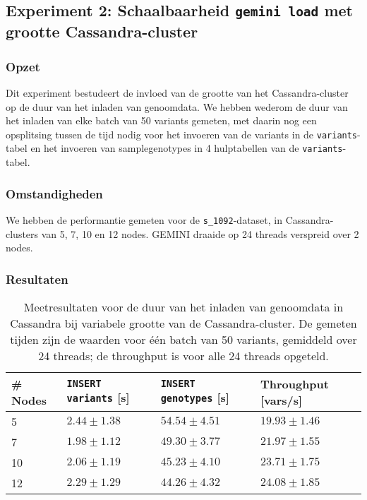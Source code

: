   
\subsection{Experiment 2: Schaalbaarheid \texttt{gemini load} met grootte Cassandra-cluster}
\label{exp2}

\subsubsection{Opzet}

Dit experiment bestudeert de invloed van de grootte van het Cassandra-cluster op de duur van het inladen van genoomdata. We hebben wederom de duur van het inladen van elke batch van 50 variants gemeten, met daarin nog een opsplitsing tussen de tijd nodig voor het invoeren van de variants in de \texttt{variants}-tabel en het invoeren van samplegenotypes in 4 hulptabellen van de \texttt{variants}-tabel.

\subsubsection{Omstandigheden}

We hebben de performantie gemeten voor de \texttt{s\_1092}-dataset, in Cassandra-clusters van 5, 7, 10 en 12 nodes. GEMINI draaide op 24 threads verspreid over 2 nodes.

\subsubsection{Resultaten}

\begin{table}[h]
\centering
\begin{tabular}{@{}llll@{}}
\cmidrule(l){1-4}
\multicolumn{1}{|l|}{\textbf{\# Nodes}}  & \multicolumn{1}{l|}{\textbf{\texttt{INSERT variants} [s]}} & \multicolumn{1}{l|}{\textbf{\texttt{INSERT genotypes} [s]}} & \multicolumn{1}{l|}{\textbf{Throughput [vars/s]}}             \\ \midrule
\multicolumn{1}{|l|}{5} & \multicolumn{1}{l|}{$2.44 \pm 1.38$} & \multicolumn{1}{l|}{$54.54 \pm 4.51$}   & \multicolumn{1}{l|}{$19.93 \pm 1.46$}\\
\multicolumn{1}{|l|}{7} & \multicolumn{1}{l|}{$1.98 \pm 1.12$} & \multicolumn{1}{l|}{$49.30 \pm 3.77$}     &  \multicolumn{1}{l|}{$21.97 \pm 1.55$}  \\
\multicolumn{1}{|l|}{10} & \multicolumn{1}{l|}{$2.06 \pm 1.19$} & \multicolumn{1}{l|}{$45.23 \pm 4.10$}     &  \multicolumn{1}{l|}{$23.71 \pm 1.75$}  \\
\multicolumn{1}{|l|}{12} & \multicolumn{1}{l|}{$2.29 \pm 1.29$} &\multicolumn{1}{l|}{$44.26 \pm 4.32$}     &  \multicolumn{1}{l|}{$24.08 \pm 1.85$}  \\
\bottomrule
\end{tabular}
\caption{Meetresultaten voor de duur van het inladen van genoomdata in Cassandra bij variabele grootte van de Cassandra-cluster. De gemeten tijden zijn de waarden voor \'e\'en batch van 50 variants, gemiddeld over 24 threads; de throughput is voor alle 24 threads opgeteld.}
\end{table}

